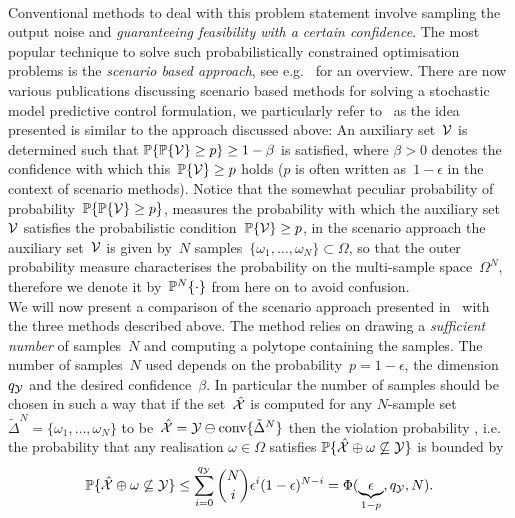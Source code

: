 %
\\[1em]
%
Conventional methods to deal with this problem statement involve sampling the output noise and \emph{guaranteeing feasibility with a certain confidence}.
%
The most popular technique to solve such probabilistically constrained optimisation problems is the \emph{scenario based approach}, see e.g.~\cite{Calafiore:2010,Campi:2011} for an overview.
%
There are now various publications discussing scenario based methods for solving a stochastic model predictive control formulation, we particularly refer to~\cite{Margellos:2014,Zhang:2015} as the idea presented is similar to the approach discussed above:
%
An auxiliary set~$\mathcal V$ is determined such that $\mathbb P\{\mathbb P\{\mathcal V\}\geq p\}\geq 1-\beta$ is satisfied, where $\beta>0$ denotes the confidence with which this~$\mathbb P\{\mathcal V\}\geq p$ holds ($p$ is often written as~$1-\epsilon$ in the context of scenario methods).
%
Notice that the somewhat peculiar probability of probability~$\mathbb P\{\mathbb P\{\mathcal V\}\geq p\}$, measures the probability with which the auxiliary set~$\mathcal V$ satisfies the probabilistic condition~$\mathbb P\{\mathcal V\}\geq p$, in the scenario approach the auxiliary set~$\mathcal V$ is given by~$N$ samples~$\{\omega_1,\dots,\omega_N\}\subset\Omega$, so that the outer probability measure characterises the probability on the multi-sample space~$\Omega^N$, therefore we denote it by~$\mathbb P^N\{\cdot\}$ from here on to avoid confusion.
%
\\[1em]
%
We will now present a comparison of the scenario approach presented in~\cite{Zhang:2015} with the three methods described above.
%
The method relies on drawing a \emph{sufficient number} of samples~$N$ and computing a polytope containing the samples.
%
The number of samples~$N$ used depends on the probability~$p=1-\epsilon$, the dimension~$q_\mathcal Y$ and the desired confidence~$\beta$.
%
In particular the number of samples should be chosen in such a way that if the set~$\hat{\mathcal X}$ is computed for any $N$-sample set~$\tilde\Delta^N=\{\omega_1,\dots,\omega_N\}$ to be~$\hat{\mathcal X}=\mathcal Y\ominus\text{conv}\{\tilde\Delta^N\}$ then the violation probability , i.e. the probability that any realisation $\omega\in\Omega$ satisfies $\mathbb P\{\hat{\mathcal X} \oplus {\omega} \not\subseteq \mathcal Y\}$ is bounded by
%
\begin{equation}\label{eq:violation:probability}
	\mathbb P\{\hat{\mathcal X} \oplus {\omega} \not\subseteq \mathcal Y\}\leq\sum_{i=0}^{q_\mathcal Y}\binom{N}{i}\epsilon^{i}(1-\epsilon)^{N-i}=\Phi(\underbrace{\epsilon}_{1-p},q_\mathcal Y,N).
\end{equation}

